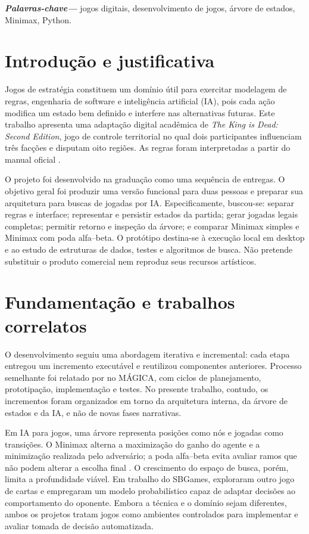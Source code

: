 \documentclass[12pt]{article}
\renewcommand{\palavraschave}[1]{%
  \vspace{6pt}\small\linebreak
  \textbf{\textit{Palavras-chave---}} #1
}
\begin{document}
\palavraschave{jogos digitais, desenvolvimento de jogos, árvore de estados, Minimax, Python.}

\section{Introdução e justificativa}

Jogos de estratégia constituem um domínio útil para exercitar modelagem de regras, engenharia de software e inteligência artificial (IA), pois cada ação modifica um estado bem definido e interfere nas alternativas futuras. Este trabalho apresenta uma adaptação digital acadêmica de \textit{The King is Dead: Second Edition}, jogo de controle territorial no qual dois participantes influenciam três facções e disputam oito regiões. As regras foram interpretadas a partir do manual oficial \cite{osprey2020king}.

O projeto foi desenvolvido na graduação como uma sequência de entregas. O objetivo geral foi produzir uma versão funcional para duas pessoas e preparar sua arquitetura para buscas de jogadas por IA. Especificamente, buscou-se: separar regras e interface; representar e persistir estados da partida; gerar jogadas legais completas; permitir retorno e inspeção da árvore; e comparar Minimax simples e Minimax com poda alfa--beta. O protótipo destina-se à execução local em desktop e ao estudo de estruturas de dados, testes e algoritmos de busca. Não pretende substituir o produto comercial nem reproduz seus recursos artísticos.

\section{Fundamentação e trabalhos correlatos}

O desenvolvimento seguiu uma abordagem iterativa e incremental: cada etapa entregou um incremento executável e reutilizou componentes anteriores. Processo semelhante foi relatado por \cite{castro2024autunno} no MÁGICA, com ciclos de planejamento, prototipação, implementação e testes. No presente trabalho, contudo, os incrementos foram organizados em torno da arquitetura interna, da árvore de estados e da IA, e não de novas fases narrativas.

Em IA para jogos, uma árvore representa posições como nós e jogadas como transições. O Minimax alterna a maximização do ganho do agente e a minimização realizada pelo adversário; a poda alfa--beta evita avaliar ramos que não podem alterar a escolha final \cite{russell2021aima}. O crescimento do espaço de busca, porém, limita a profundidade viável. Em trabalho do SBGames, \cite{assuncao2022truco} exploraram outro jogo de cartas e empregaram um modelo probabilístico capaz de adaptar decisões ao comportamento do oponente. Embora a técnica e o domínio sejam diferentes, ambos os projetos tratam jogos como ambientes controlados para implementar e avaliar tomada de decisão automatizada.
\end{document}
